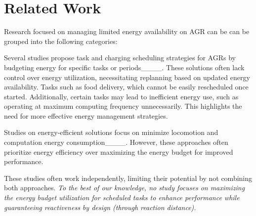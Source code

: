 \section{Related Work}
\vspace{-1mm}
\label{sec:related}


Research focused on managing limited energy availability on AGR can be can be grouped into the following categories:

 Several studies propose task and charging scheduling strategies for AGRs by budgeting energy for specific tasks or periods____. These solutions often lack control over energy utilization, necessitating replanning based on updated energy availability. Tasks such as food delivery, which cannot be easily rescheduled once started. Additionally, certain tasks may lead to inefficient energy use, such as operating at maximum computing frequency unnecessarily. This highlights the need for more effective energy management strategies.

 Studies  on energy-efficient solutions focus on minimize  locomotion and computation energy consumption____. However, these approaches often prioritize energy efficiency over maximizing the energy budget for improved performance.

These studies often work independently, limiting their potential by not combining both approaches. \textit{To the best of our knowledge, no study focuses on maximizing the energy budget utilization for scheduled tasks to enhance performance while guaranteeing reactiveness by design (through reaction distance).} 



\vspace{-1mm}